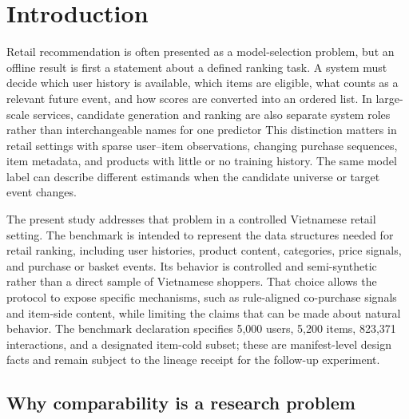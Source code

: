 
\section{Introduction}

Retail recommendation is often presented as a model-selection problem, but an
offline result is first a statement about a defined ranking task. A system must
decide which user history is available, which items are eligible, what counts as
a relevant future event, and how scores are converted into an ordered list. In
large-scale services, candidate generation and ranking are also separate system
roles rather than interchangeable names for one predictor
\cite{covington2016_youtube} %
\cite{yi2019_ndr} %
This distinction matters in retail settings with sparse user--item observations,
changing purchase sequences, item metadata, and products with little or no
training history. The same model label can describe different estimands when
the candidate universe or target event changes.

The present study addresses that problem in a controlled Vietnamese retail
setting. The benchmark is intended to represent the data structures needed for
retail ranking, including user histories, product content, categories, price
signals, and purchase or basket events. Its behavior is controlled and
semi-synthetic rather than a direct sample of Vietnamese shoppers. That choice
allows the protocol to expose specific mechanisms, such as rule-aligned
co-purchase signals and item-side content, while limiting the claims that can be
made about natural behavior. The benchmark declaration specifies 5,000 users,
5,200 items, 823,371 interactions, and a designated item-cold subset; these are
manifest-level design facts and remain subject to the lineage receipt for the
follow-up experiment.

\subsection{Why comparability is a research problem}

